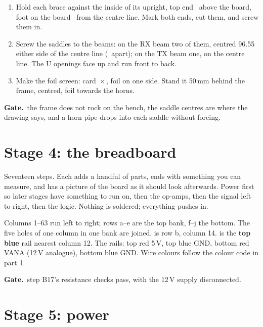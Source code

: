 \documentclass[10pt]{article}
\newcommand{\gate}[1]{\begin{okbox}\textbf{\color{okgreen!70!black}Gate.}\ #1\end{okbox}}
\begin{document}
\begin{enumerate}
  \item Hold each brace against the inside of its upright, top end \braceTop\ above the board, foot on the board \braceFootX\ from the centre line. Mark both ends, cut them, and screw them in.
  \item Screw the saddles to the beams: on the RX beam two of them, centred 96.55 either side of the centre line (\hornBase\ apart); on the TX beam one, on the centre line. The U openings face up and run front to back.
  \item Make the foil screen: card \screenW\,×\,\screenH, foil on one side. Stand it 50\,mm behind the frame, centred, foil towards the horns.
\end{enumerate}
\gate{the frame does not rock on the bench, the saddle centres are where the drawing says, and a horn pipe drops into each saddle without forcing.}

\newpage
\section{Stage 4: the breadboard}\label{sec:bb}

Seventeen steps. Each adds a handful of parts, ends with something you can measure, and has a picture of the board as it should look afterwards. Power first so later stages have something to run on, then the op-amps, then the signal left to right, then the logic. Nothing is soldered; everything pushes in.

\begin{note}
Columns 1–63 run left to right; rows a–e are the top bank, f–j the bottom. The five holes of one column in one bank are joined.  is row b, column 14.  is the \textbf{top blue} rail nearest column 12. The rails: top red 5\,V, top blue GND, bottom red VANA (12\,V analogue), bottom blue GND. Wire colours follow the colour code in part 1.
\end{note}



\gate{step B17's resistance checks pass, with the 12\,V supply disconnected.}

\newpage
\section{Stage 5: power}\label{sec:power}
\end{document}
